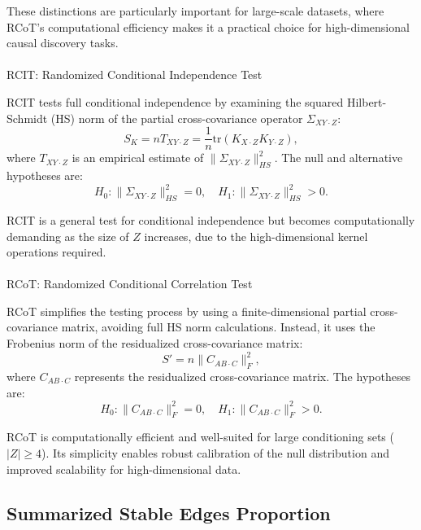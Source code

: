 \documentclass[
]{article}
\makeatletter
\let\oldparagraph\paragraph
\renewcommand{\paragraph}{
    \@ifstar
      \xxxParagraphStar
      \xxxParagraphNoStar
  }
\newcommand{\xxxParagraphStar}[1]{\oldparagraph*{#1}\mbox{}}
\newcommand{\xxxParagraphNoStar}[1]{\oldparagraph{#1}\mbox{}}
\makeatother
\begin{document}
These distinctions are particularly important for large-scale datasets,
where RCoT's computational efficiency makes it a practical choice for
high-dimensional causal discovery tasks.

\paragraph{RCIT: Randomized Conditional Independence
Test}\label{rcit-randomized-conditional-independence-test}

RCIT tests full conditional independence by examining the squared
Hilbert-Schmidt (HS) norm of the partial cross-covariance operator
\(\Sigma_{XY \cdot Z}\): \[
S_K = n T_{XY \cdot Z} = \frac{1}{n} \text{tr}(K_{X \cdot Z} K_{Y \cdot Z}),
\] where \(T_{XY \cdot Z}\) is an empirical estimate of
\(\|\Sigma_{XY \cdot Z}\|^2_{HS}\). The null and alternative hypotheses
are: \[
H_0: \|\Sigma_{XY \cdot Z}\|^2_{HS} = 0, \quad H_1: \|\Sigma_{XY \cdot Z}\|^2_{HS} > 0.
\]

RCIT is a general test for conditional independence but becomes
computationally demanding as the size of \(Z\) increases, due to the
high-dimensional kernel operations required.

\paragraph{RCoT: Randomized Conditional Correlation
Test}\label{rcot-randomized-conditional-correlation-test}

RCoT simplifies the testing process by using a finite-dimensional
partial cross-covariance matrix, avoiding full HS norm calculations.
Instead, it uses the Frobenius norm of the residualized cross-covariance
matrix: \[
S' = n \|C_{AB \cdot C}\|_F^2,
\] where \(C_{AB \cdot C}\) represents the residualized cross-covariance
matrix. The hypotheses are: \[
H_0: \|C_{AB \cdot C}\|_F^2 = 0, \quad H_1: \|C_{AB \cdot C}\|_F^2 > 0.
\]

RCoT is computationally efficient and well-suited for large conditioning
sets (\(|Z| \geq 4\)). Its simplicity enables robust calibration of the
null distribution and improved scalability for high-dimensional data.

\subsection{Summarized Stable Edges Proportion}\label{sec-propmatrix}
\end{document}
